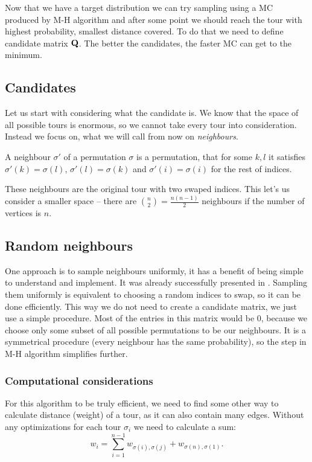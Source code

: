 Now that we have a target distribution we can try sampling using a MC produced by M-H algorithm and after some point we should reach the tour with highest probability, \ie smallest distance covered. To do that we need to define candidate matrix $\mathbf{Q}$. The better the candidates, the faster MC can get to the minimum.

\subsection{Candidates}
	Let us start with considering what the candidate is. We know that the space of all possible tours is enormous, so we cannot take every tour into consideration. Instead we focus on, what we will call from now on \textit{neighbours}.
	\begin{definition}
		A neighbour $\sigma'$ of a permutation $\sigma$ is a permutation, that for some $k, l$ it satisfies $\sigma'(k) = \sigma(l)$, $\sigma'(l) = \sigma(k)$ and $\sigma'(i) = \sigma(i)$ for the rest of indices.
	\end{definition}
	These neighbours are the original tour with two swaped indices. This let's us consider a smaller space -- there are $\binom{n}{2} = \frac{n(n-1)}{2}$ neighbours if the number of vertices is $n$.

\subsection{Random neighbours}
	One approach is to sample neighbours uniformly, it has a benefit of being simple to understand and implement. It was already successfully presented in \cite{decryption_tsp_MCMC}. Sampling them uniformly is equivalent to choosing a random indices to swap, so it can be done efficiently. This way we do not need to create a candidate matrix, we just use a simple procedure. Most of the entries in this matrix would be $0$, because we choose only some subset of all possible permutations to be our neighbours. It is a symmetrical procedure (every neighbour has the same probability), so the step in M-H algorithm simplifies further.
	
	\subsubsection{Computational considerations}
		For this algorithm to be truly efficient, we need to find some other way to calculate distance (weight) of a tour, as it can also contain many edges. Without any optimizations for each tour $\sigma_i$ we need to calculate a sum:
		\begin{equation*}
			w_i = \sum_{i=1}^{n-1} w_{\sigma(i), \sigma(j)} + w_{\sigma(n), \sigma(1)}.
		\end{equation*}
		
